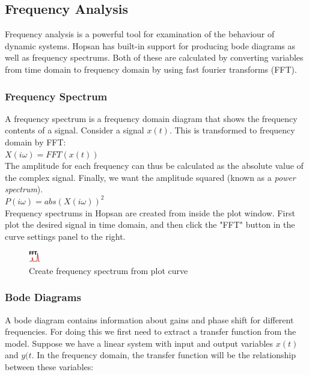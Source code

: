 
\subsection{Frequency Analysis}
Frequency analysis is a powerful tool for examination of the behaviour of dynamic systems. Hopsan has built-in support for producing bode diagrams as well as frequency spectrums. Both of these are calculated by converting variables from time domain to frequency domain by using fast fourier transforms (FFT).

\subsubsection{Frequency Spectrum}
A frequency spectrum is a frequency domain diagram that shows the frequency contents of a signal. Consider a signal $x(t)$. This is transformed to frequency domain by FFT:\\

$X(i\omega)=FFT(x(t))$\\

The amplitude for each frequency can thus be calculated as the absolute value of the complex signal. Finally, we want the amplitude squared (known as a \textit{power spectrum}).\\

$P(i\omega)=abs(X(i\omega))^2$\\

Frequency spectrums in Hopsan are created from inside the plot window. First plot the desired signal in time domain, and then click the "FFT" button in the curve settings panel to the right.


\begin{figure}
  \includegraphics[width=5mm]
    {../../HopsanGUI/graphics/uiicons/Hopsan-FrequencyAnalysis.png}%
  \caption*{Create frequency spectrum from plot curve}
\end{figure} 
\subsubsection{Bode Diagrams}
A bode diagram contains information about gains and phase shift for different frequencies. For doing this we first need to extract a transfer function from the model. Suppose we have a linear system with input and output variables $x(t)$ and $y(t$. In the frequency domain, the transfer function will be the relationship between these variables:\\

